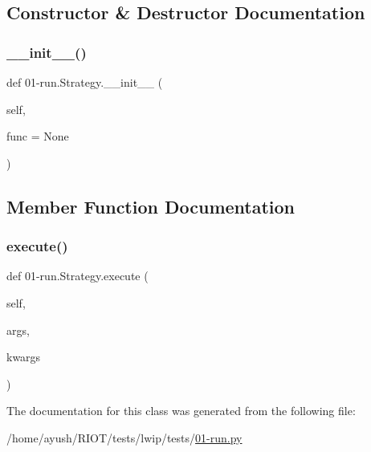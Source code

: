\subsection{Constructor \& Destructor Documentation}
\mbox{\label{class01-run_1_1Strategy_aa2524f763ebf13d960888c4c00628a23}} 
\subsubsection{\texorpdfstring{\+\_\+\+\_\+init\+\_\+\+\_\+()}{\_\_init\_\_()}}
{\footnotesize\ttfamily def 01-\/run.\+Strategy.\+\_\+\+\_\+init\+\_\+\+\_\+ (\begin{DoxyParamCaption}\item[{}]{self,  }\item[{}]{func = {\ttfamily None} }\end{DoxyParamCaption})}



\subsection{Member Function Documentation}
\mbox{\label{class01-run_1_1Strategy_a0d7ab0f31a0f5a29a7f307f9bdfbfd40}} 
\subsubsection{\texorpdfstring{execute()}{execute()}}
{\footnotesize\ttfamily def 01-\/run.\+Strategy.\+execute (\begin{DoxyParamCaption}\item[{}]{self,  }\item[{}]{args,  }\item[{}]{kwargs }\end{DoxyParamCaption})}



The documentation for this class was generated from the following file\+:\begin{DoxyCompactItemize}
\item 
/home/ayush/\+R\+I\+O\+T/tests/lwip/tests/\hyperlink{lwip_2tests_201-run_8py}{01-\/run.\+py}\end{DoxyCompactItemize}
